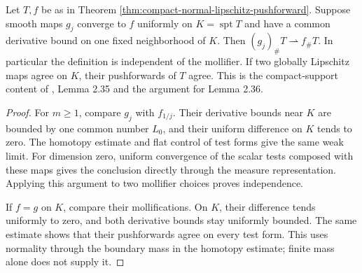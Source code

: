 \begin{proposition}\label{prop:normal-pushforward-approximation-independence}
Let $T,f$ be as in Theorem \ref{thm:compact-normal-lipschitz-pushforward}. Suppose smooth maps $g_j$ converge to $f$ uniformly on $K=\operatorname{spt}T$ and have a common derivative bound on one fixed neighborhood of $K$. Then $(g_j)_\#T\rightharpoonup f_\#T$. In particular the definition is independent of the mollifier. If two globally Lipschitz maps agree on $K$, their pushforwards of $T$ agree. This is the compact-support content of \cite{Sim18}, Lemma 2.35 and the argument for Lemma 2.36.
\end{proposition}
\begin{proof}
For $m\geq1$, compare $g_j$ with $f_{1/j}$. Their derivative bounds near $K$ are bounded by one common number $L_0$, and their uniform difference on $K$ tends to zero. The homotopy estimate and flat control of test forms give the same weak limit. For dimension zero, uniform convergence of the scalar tests composed with these maps gives the conclusion directly through the measure representation. Applying this argument to two mollifier choices proves independence.

If $f=g$ on $K$, compare their mollifications. On $K$, their difference tends uniformly to zero, and both derivative bounds stay uniformly bounded. The same estimate shows that their pushforwards agree on every test form. This uses normality through the boundary mass in the homotopy estimate; finite mass alone does not supply it.
\end{proof}

